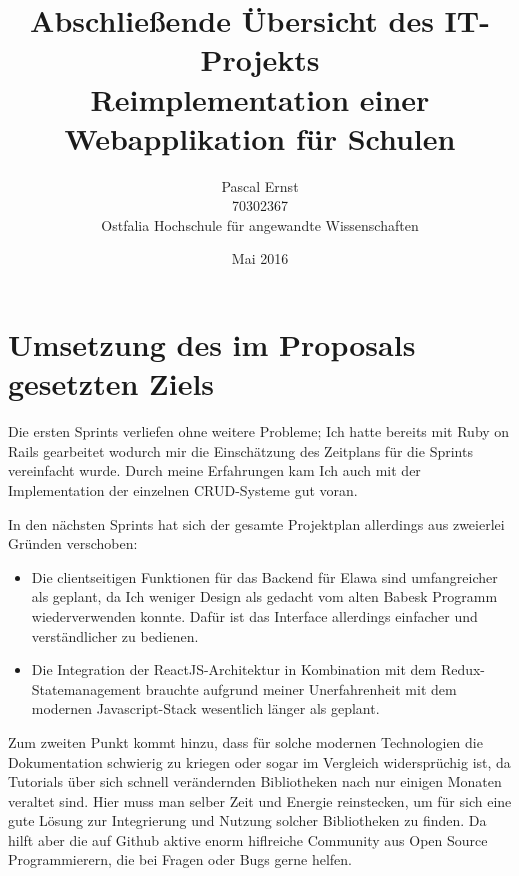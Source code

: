 \documentclass[a4paper,10pt]{scrartcl}
\begin{document}
\title{Abschließende Übersicht des IT-Projekts \\
  Reimplementation einer Webapplikation für Schulen}
\author{Pascal Ernst\\
  70302367 \\
  Ostfalia Hochschule für angewandte Wissenschaften}
\date{Mai 2016}
\maketitle

\newpage

\section{Umsetzung des im Proposals gesetzten Ziels}

  Die ersten Sprints verliefen ohne weitere Probleme;
  Ich hatte bereits mit Ruby on Rails gearbeitet wodurch mir die Einschätzung
  des Zeitplans für die Sprints vereinfacht wurde.
  Durch meine Erfahrungen kam Ich auch mit der Implementation der einzelnen
  CRUD-Systeme gut voran.

  In den nächsten Sprints hat sich der gesamte Projektplan allerdings
  aus zweierlei Gründen verschoben:

  \begin{itemize}
    \item Die clientseitigen Funktionen für das Backend für Elawa sind
      umfangreicher als geplant, da Ich weniger Design als gedacht vom alten
      Babesk Programm wiederverwenden konnte.
      Dafür ist das Interface allerdings einfacher und verständlicher zu
      bedienen.
    \item Die Integration der ReactJS-Architektur in Kombination mit dem
      \newline
      Redux-Statemanagement brauchte aufgrund meiner Unerfahrenheit mit dem
      modernen Javascript-Stack wesentlich länger als geplant.
  \end{itemize}

  Zum zweiten Punkt kommt hinzu, dass für solche modernen Technologien die
  Dokumentation schwierig zu kriegen oder sogar im Vergleich widersprüchig ist,
  da Tutorials über sich schnell verändernden Bibliotheken nach nur einigen
  Monaten veraltet sind.
  Hier muss man selber Zeit und Energie reinstecken, um für sich eine gute
  Lösung zur Integrierung und Nutzung solcher Bibliotheken zu finden.
  Da hilft aber die auf Github aktive enorm hiflreiche Community aus Open
  Source Programmierern, die bei Fragen oder Bugs gerne helfen.
\end{document}
